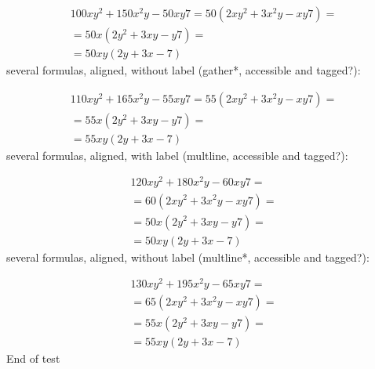 \documentclass{article}
\begin{document}
\begin{gather}
100xy^2+150x^2y-50xy7 =50\left(2xy^2+3x^2y-xy7\right) = \\
= 50x\left(2y^2+3xy-y7\right) = \\
= 50xy\left(2y+3x-7\right)
\end{gather}
several formulas, aligned, without label (gather*, accessible and tagged?):

\begin{gather*}
110xy^2+165x^2y-55xy7=55\left(2xy^2+3x^2y-xy7\right) = \\
= 55x\left(2y^2+3xy-y7\right) = \\
= 55xy\left(2y+3x-7\right)
\end{gather*}
several formulas, aligned, with label (multline, accessible and tagged?):

\begin{multline}
120xy^2+180x^2y-60xy7 =\\
=60\left(2xy^2+3x^2y-xy7\right) = \\
= 50x\left(2y^2+3xy-y7\right) = \\
= 50xy\left(2y+3x-7\right)
\end{multline}
several formulas, aligned, without label (multline*, accessible and tagged?):

\begin{multline*}
130xy^2+195x^2y-65xy7=\\
 =65\left(2xy^2+3x^2y-xy7\right) = \\
= 55x\left(2y^2+3xy-y7\right) = \\
= 55xy\left(2y+3x-7\right)
\end{multline*}
End of test
\end{document}
